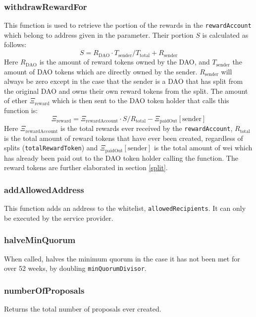 \documentclass[9pt,oneside]{amsart}
\begin{document}
\begin{multicols}{2}
\subsubsection*{withdrawRewardFor}
This function is used to retrieve the portion of the rewards in the \verb|rewardAccount| which belong to address given in the parameter.
Their portion $S$ is calculated as follows:
\begin{equation}
 S = R_{\text{DAO}} \cdot T_{\text{sender}} / T_{\text{total}} + R_{\text{sender}}
\end{equation}
Here $R_{\text{DAO}}$ is the amount of reward tokens owned by the DAO, and $T_{\text{sender}}$ the amount of DAO tokens which are directly owned by the sender. $R_{\text{sender}}$ will always be zero except in the case that the sender is a DAO that has split from the original DAO and owns their own reward tokens from the split.
The amount of ether $\Xi_{\text{reward}}$ which is then sent to the DAO token holder that calls this function is:
\begin{equation}
\Xi_{\text{reward}} = \Xi_{\text{rewardAccount}} \cdot S / R_{\text{total}} - \Xi_{\text{paidOut}}[\text{sender}]
\end{equation}
Here $\Xi_{\text{rewardAccount}}$ is the total rewards ever received by the \verb|rewardAccount|, $R_{\text{total}}$ is the total amount of reward tokens that have ever been created, regardless of splits (\verb|totalRewardToken|) and $\Xi_{\text{paidOut}}[\text{sender}]$ is the total amount of wei which has already been paid out to the DAO token holder calling the function. The reward tokens are further elaborated in section \ref{split}.
\subsubsection*{addAllowedAddress}
This function adds an address to the whitelist, \verb|allowedRecipients|. It can only be executed by the service provider.

\subsubsection*{halveMinQuorum}
When called, halves the minimum quorum in the case it has not been met for over 52 weeks, by doubling \verb|minQuorumDivisor|.

\subsubsection*{numberOfProposals}
Returns the total number of proposals ever created.


\end{multicols}
\end{document}
